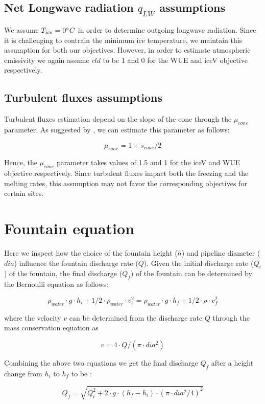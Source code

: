 \documentclass[tc, manuscript]{copernicus}
\begin{document}
\subsection{Net Longwave radiation \texorpdfstring{$q_{LW}$}{Lg} assumptions} \label{sec:LW}

We assume $T_{ice} = 0 ^{\circ} C$ in order to determine outgoing longwave radiation. Since it is challenging to
contrain the minimum ice temperature, we maintain this assumption for both our objectives. However, in order to
estimate atmospheric emissivity we again assume $cld$ to be 1 and 0 for the WUE and iceV objective respectively.

\subsection{Turbulent fluxes assumptions} \label{sec:Qs}

Turbulent fluxes estimation depend on the slope of the cone through the $\mu_{cone}$ parameter. As suggested 
by \citet{oerlemansBriefCommunicationGrowth2021}, we can estimate this parameter as follows:

\begin{equation}
  \mu_{cone} =1 + s_{cone}/2
\end{equation}

Hence, the $\mu_{cone}$ parameter takes values of 1.5 and 1 for the iceV and WUE objective respectively.  Since
turbulent fluxes impact both the freezing and the melting rates, this assumption may not favor the corresponding
objectives for certain sites.

\section{Fountain equation} \label{sec:fountain}

Here we inspect how the choice of the fountain height ($h$) and pipeline diameter ($dia$) influence the fountain
discharge rate ($Q$). Given the initial discharge rate ($Q_i$) of the fountain, the final discharge ($Q_f$) of
the fountain can be determined by the Bernoulli equation as follows: 

\begin{equation}
  \rho_{water} \cdot g \cdot h_i + 1/2 \cdot \rho_{water} \cdot v_i^2 = \rho_{water} \cdot g \cdot h_f + 1/2 \cdot \rho \cdot v_f^2
\end{equation}

where the velocity $v$ can be determined from the discharge rate $Q$ through the mass conservation equation as 

\begin{equation}
 v = 4 \cdot Q/(\pi \cdot dia^2)
\end{equation}

Combining the above two equations we get the final discharge $Q_f$ after a height change from $h_i$ to $h_f$ to be :

\begin{equation}
  \label{eqn:fountain}
  Q_f = \sqrt{Q_i^2 + 2 \cdot g \cdot (h_f-h_i) \cdot (\pi \cdot dia^2/4)^2}
\end{equation}

\noappendix 



\end{document}
